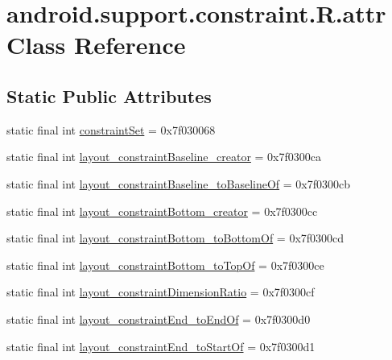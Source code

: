 \hypertarget{classandroid_1_1support_1_1constraint_1_1R_1_1attr}{}\section{android.\+support.\+constraint.\+R.\+attr Class Reference}
\label{classandroid_1_1support_1_1constraint_1_1R_1_1attr}
\subsection*{Static Public Attributes}
\begin{DoxyCompactItemize}
\item 
static final int \mbox{\hyperlink{classandroid_1_1support_1_1constraint_1_1R_1_1attr_ae52cf5695204b7da3ea816100b4244e5}{constraint\+Set}} = 0x7f030068
\item 
static final int \mbox{\hyperlink{classandroid_1_1support_1_1constraint_1_1R_1_1attr_a8ccd5dd490cb4cb5b3ee77215d7e1206}{layout\+\_\+constraint\+Baseline\+\_\+creator}} = 0x7f0300ca
\item 
static final int \mbox{\hyperlink{classandroid_1_1support_1_1constraint_1_1R_1_1attr_a86f1f977d17bfb39e97e519869718a3e}{layout\+\_\+constraint\+Baseline\+\_\+to\+Baseline\+Of}} = 0x7f0300cb
\item 
static final int \mbox{\hyperlink{classandroid_1_1support_1_1constraint_1_1R_1_1attr_a3e14c3b491d6d6ad68b192982cc2796c}{layout\+\_\+constraint\+Bottom\+\_\+creator}} = 0x7f0300cc
\item 
static final int \mbox{\hyperlink{classandroid_1_1support_1_1constraint_1_1R_1_1attr_a2540c169c67181d51017f07909a3f5c6}{layout\+\_\+constraint\+Bottom\+\_\+to\+Bottom\+Of}} = 0x7f0300cd
\item 
static final int \mbox{\hyperlink{classandroid_1_1support_1_1constraint_1_1R_1_1attr_a702b1a511230e9a24a3122757dfd8caa}{layout\+\_\+constraint\+Bottom\+\_\+to\+Top\+Of}} = 0x7f0300ce
\item 
static final int \mbox{\hyperlink{classandroid_1_1support_1_1constraint_1_1R_1_1attr_a2f8edb013be20eba0002747e7160c05d}{layout\+\_\+constraint\+Dimension\+Ratio}} = 0x7f0300cf
\item 
static final int \mbox{\hyperlink{classandroid_1_1support_1_1constraint_1_1R_1_1attr_ac33072d697b98229d64e9c7a52cf2be7}{layout\+\_\+constraint\+End\+\_\+to\+End\+Of}} = 0x7f0300d0
\item 
static final int \mbox{\hyperlink{classandroid_1_1support_1_1constraint_1_1R_1_1attr_a17a0995fff6b68fa1bd50d8b79655221}{layout\+\_\+constraint\+End\+\_\+to\+Start\+Of}} = 0x7f0300d1

\end{DoxyCompactItemize}
